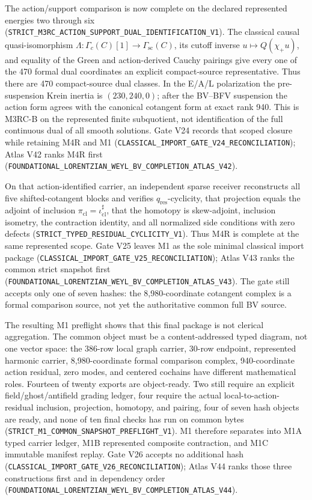 \documentclass[11pt]{article}
\theoremstyle{definition}
\theoremstyle{remark}
\newcommand{\cert}[1]{\nolinkurl{#1}}
\begin{document}
The action/support comparison is now complete on the declared represented
energies two through six
(\cert{STRICT_M3RC_ACTION_SUPPORT_DUAL_IDENTIFICATION_V1}).  The classical
causal quasi-isomorphism
\(\Lambda\colon\Gamma_c(C)[1]\rightarrow\Gamma_{\mathrm{sc}}(C)\), its cutoff
inverse \(u\mapsto Q(\chi_+u)\), and equality of the Green and action-derived
Cauchy pairings give every one of the 470 formal dual coordinates an explicit
compact-source representative.  Thus there are 470 compact-source dual
classes.  In the E/A/L polarization the pre-suspension Krein inertia is
\((230,240,0)\); after the BV--BFV suspension the action form
agrees with the canonical cotangent form at exact rank 940.  This is M3RC-B on
the represented finite subquotient, not identification of the full continuous
dual of all smooth solutions.  Gate V24 records that scoped closure while
retaining M4R and M1
(\cert{CLASSICAL_IMPORT_GATE_V24_RECONCILIATION}); Atlas V42 ranks M4R first
(\cert{FOUNDATIONAL_LORENTZIAN_WEYL_BV_COMPLETION_ATLAS_V42}).

On that action-identified carrier, an independent sparse receiver reconstructs
all five shifted-cotangent blocks and verifies \(q_{\mathrm{res}}\)-cyclicity,
that projection equals the adjoint of inclusion
\(\pi_{\mathrm{cl}}=\iota_{\mathrm{cl}}^\sharp\), that the homotopy is
skew-adjoint, inclusion isometry, the contraction identity, and all
normalized side conditions with zero defects
(\cert{STRICT_TYPED_RESIDUAL_CYCLICITY_V1}).  Thus M4R is complete at the same
represented scope.  Gate V25 leaves M1 as the sole minimal classical import
package (\cert{CLASSICAL_IMPORT_GATE_V25_RECONCILIATION}); Atlas V43 ranks the
common strict snapshot first
(\cert{FOUNDATIONAL_LORENTZIAN_WEYL_BV_COMPLETION_ATLAS_V43}).  The gate still
accepts only one of seven hashes: the 8,980-coordinate cotangent complex is a
formal comparison source, not yet the authoritative common full BV source.

The resulting M1 preflight shows that this final package is not clerical
aggregation.  The common object must be a content-addressed typed diagram, not
one vector space: the 386-row local graph carrier, 30-row endpoint, represented
harmonic carrier, 8,980-coordinate formal comparison complex, 940-coordinate
action residual, zero modes, and centered cochains have different mathematical
roles.  Fourteen of twenty exports are object-ready.  Two still require an
explicit field/ghost/antifield grading ledger, four require the actual
local-to-action-residual inclusion, projection, homotopy, and pairing, four of
seven hash objects are ready, and none of ten final checks has run on common
bytes (\cert{STRICT_M1_COMMON_SNAPSHOT_PREFLIGHT_V1}).  M1 therefore separates
into M1A typed carrier ledger, M1B represented composite contraction, and M1C
immutable manifest replay.  Gate V26 accepts no additional hash
(\cert{CLASSICAL_IMPORT_GATE_V26_RECONCILIATION}); Atlas V44 ranks those three
constructions first and in dependency order
(\cert{FOUNDATIONAL_LORENTZIAN_WEYL_BV_COMPLETION_ATLAS_V44}).
\end{document}
